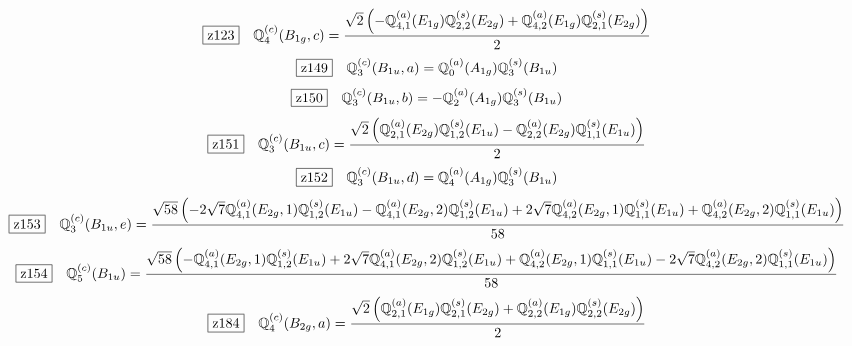 \documentclass[fleqn,10pt,landscape]{jsarticle}
\begin{document}
\begin{dmath*}
\hspace*{3mm}\fbox{z123}\quad \mathbb{Q}_{4}^{(c)}(B_{1g},c)=\frac{\sqrt{2} \left(- \mathbb{Q}_{4,1}^{(a)}(E_{1g}) \mathbb{Q}_{2,2}^{(s)}(E_{2g}) + \mathbb{Q}_{4,2}^{(a)}(E_{1g}) \mathbb{Q}_{2,1}^{(s)}(E_{2g})\right)}{2}
\end{dmath*}
\begin{dmath*}
\hspace*{3mm}\fbox{z149}\quad \mathbb{Q}_{3}^{(c)}(B_{1u},a)=\mathbb{Q}_{0}^{(a)}(A_{1g}) \mathbb{Q}_{3}^{(s)}(B_{1u})
\end{dmath*}
\begin{dmath*}
\hspace*{3mm}\fbox{z150}\quad \mathbb{Q}_{3}^{(c)}(B_{1u},b)=- \mathbb{Q}_{2}^{(a)}(A_{1g}) \mathbb{Q}_{3}^{(s)}(B_{1u})
\end{dmath*}
\begin{dmath*}
\hspace*{3mm}\fbox{z151}\quad \mathbb{Q}_{3}^{(c)}(B_{1u},c)=\frac{\sqrt{2} \left(\mathbb{Q}_{2,1}^{(a)}(E_{2g}) \mathbb{Q}_{1,2}^{(s)}(E_{1u}) - \mathbb{Q}_{2,2}^{(a)}(E_{2g}) \mathbb{Q}_{1,1}^{(s)}(E_{1u})\right)}{2}
\end{dmath*}
\begin{dmath*}
\hspace*{3mm}\fbox{z152}\quad \mathbb{Q}_{3}^{(c)}(B_{1u},d)=\mathbb{Q}_{4}^{(a)}(A_{1g}) \mathbb{Q}_{3}^{(s)}(B_{1u})
\end{dmath*}
\begin{dmath*}
\hspace*{3mm}\fbox{z153}\quad \mathbb{Q}_{3}^{(c)}(B_{1u},e)=\frac{\sqrt{58} \left(- 2 \sqrt{7} \mathbb{Q}_{4,1}^{(a)}(E_{2g},1) \mathbb{Q}_{1,2}^{(s)}(E_{1u}) - \mathbb{Q}_{4,1}^{(a)}(E_{2g},2) \mathbb{Q}_{1,2}^{(s)}(E_{1u}) + 2 \sqrt{7} \mathbb{Q}_{4,2}^{(a)}(E_{2g},1) \mathbb{Q}_{1,1}^{(s)}(E_{1u}) + \mathbb{Q}_{4,2}^{(a)}(E_{2g},2) \mathbb{Q}_{1,1}^{(s)}(E_{1u})\right)}{58}
\end{dmath*}
\begin{dmath*}
\hspace*{3mm}\fbox{z154}\quad \mathbb{Q}_{5}^{(c)}(B_{1u})=\frac{\sqrt{58} \left(- \mathbb{Q}_{4,1}^{(a)}(E_{2g},1) \mathbb{Q}_{1,2}^{(s)}(E_{1u}) + 2 \sqrt{7} \mathbb{Q}_{4,1}^{(a)}(E_{2g},2) \mathbb{Q}_{1,2}^{(s)}(E_{1u}) + \mathbb{Q}_{4,2}^{(a)}(E_{2g},1) \mathbb{Q}_{1,1}^{(s)}(E_{1u}) - 2 \sqrt{7} \mathbb{Q}_{4,2}^{(a)}(E_{2g},2) \mathbb{Q}_{1,1}^{(s)}(E_{1u})\right)}{58}
\end{dmath*}
\begin{dmath*}
\hspace*{3mm}\fbox{z184}\quad \mathbb{Q}_{4}^{(c)}(B_{2g},a)=\frac{\sqrt{2} \left(\mathbb{Q}_{2,1}^{(a)}(E_{1g}) \mathbb{Q}_{2,1}^{(s)}(E_{2g}) + \mathbb{Q}_{2,2}^{(a)}(E_{1g}) \mathbb{Q}_{2,2}^{(s)}(E_{2g})\right)}{2}
\end{dmath*}
\end{document}
